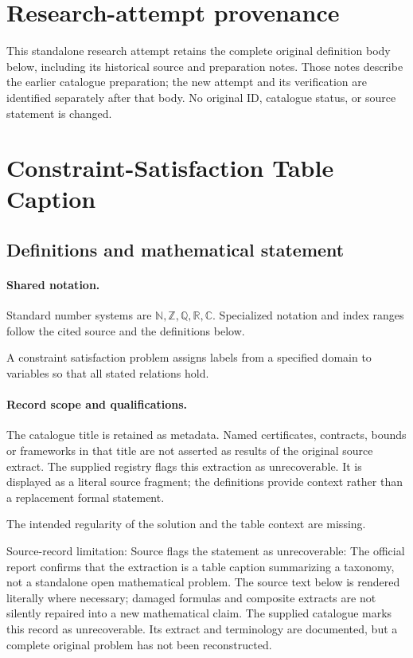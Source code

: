 \documentclass[11pt]{article}
\begin{document}
\section*{Research-attempt provenance}
This standalone research attempt retains the complete original definition body below,
including its historical source and preparation notes. Those notes describe the
earlier catalogue preparation; the new attempt and its verification are identified
separately after that body. No original ID, catalogue status, or source statement is changed.

\section{Constraint-Satisfaction Table Caption}\label{statement}

\subsection{Definitions and mathematical statement}

\paragraph{Shared notation.}Standard number systems are $\mathbb N,\mathbb Z,\mathbb Q,\mathbb R,\mathbb C$. Specialized notation and index ranges follow the cited source and the definitions below.


A constraint satisfaction problem assigns labels from a specified domain to variables so that all stated relations hold.
\paragraph{Record scope and qualifications.}
The catalogue title is retained as metadata. Named certificates, contracts, bounds or frameworks in that title are not asserted as results of the original source extract.
The supplied registry flags this extraction as unrecoverable. It is displayed as a literal source fragment; the definitions provide context rather than a replacement formal statement.

The intended regularity of the solution and the table context are missing.

Source-record limitation: Source flags the statement as unrecoverable: The official report confirms that the extraction is a table caption summarizing a taxonomy, not a standalone open mathematical problem.
The source text below is rendered literally where necessary; damaged formulas and composite extracts are not silently repaired into a new mathematical claim.
The supplied catalogue marks this record as unrecoverable. Its extract and terminology are documented, but a complete original problem has not been reconstructed.
\end{document}
